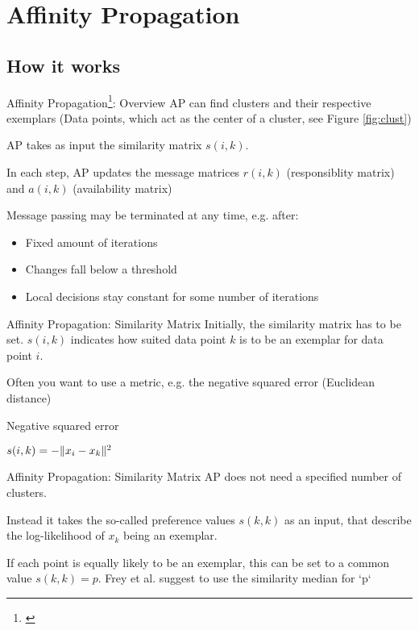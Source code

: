 \documentclass{beamer}
\DeclarePairedDelimiter\norm{\lVert}{\rVert}
\begin{document}
\section{Affinity Propagation}
\subsection{How it works}
\begin{frame}{Affinity Propagation\footnote{\cite{frey2007clustering}}: Overview}
	AP can find clusters and their respective \alert{exemplars} (Data points, which act as the center of a cluster, see Figure \ref{fig:clust})
	
	AP takes as input the \alert{similarity matrix} $s(i,k)$.
	
	In each step, AP updates the message matrices $r(i,k)$ (\alert{responsiblity matrix}) and $a(i,k)$ (\alert{availability matrix})
	
	Message passing may be terminated at any time, e.g. after:
	\begin{itemize}
		\item Fixed amount of iterations
		\item Changes fall below a threshold
		\item Local decisions stay constant for some number of iterations
	\end{itemize}
\end{frame}

\begin{frame}{Affinity Propagation: Similarity Matrix}
	Initially, the \alert{similarity matrix} has to be set. $s(i,k)$ indicates how suited data point $k$ is to be an \alert{exemplar} for data point $i$.
	
	Often you want to use a metric, e.g. the negative squared error (\alert{Euclidean distance})
	
	\begin{block}{Negative squared error}
		\begin{center}
			$s(i,k) = -\norm{x_i - x_k}^2$
		\end{center}
	\end{block}
\end{frame}

\begin{frame}{Affinity Propagation: Similarity Matrix}
    AP does not need a specified number of clusters.
    
    Instead it takes the so-called \alert{preference values} $s(k,k)$ as an input, that describe the log-likelihood of $x_k$ being an \alert{exemplar}.
    
    If each point is equally likely to be an \alert{exemplar}, this can be set to a common value $s(k,k) = p$. Frey et al. suggest to use the similarity median for `p`
\end{frame}
\end{document}
